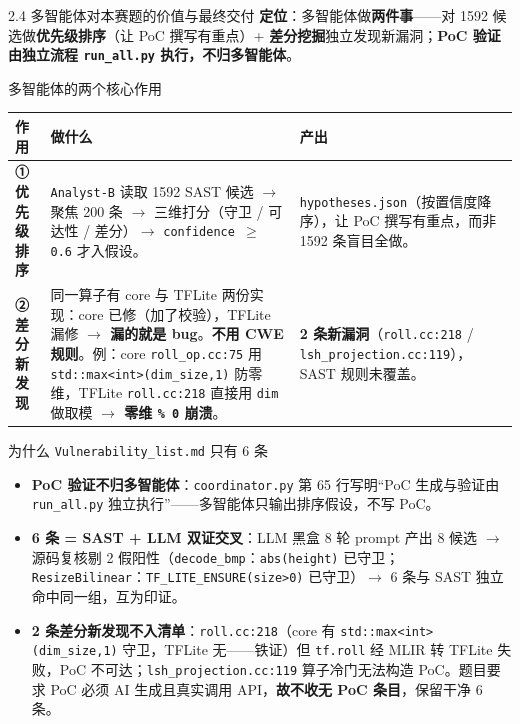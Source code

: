 \documentclass[11pt,aspectratio=169]{beamer}
\newcommand{\hl}[1]{\textcolor{red!72!black}{\textbf{#1}}}
\newcommand{\hlb}[1]{\textcolor{accentblue}{\textbf{#1}}}
\begin{document}
\begin{frame}{2.4 \quad 多智能体对本赛题的价值与最终交付}
  \footnotesize
  \hlb{定位}：多智能体做\hl{两件事}——对 1592 候选做\hl{优先级排序}（让 PoC 撰写有重点）+ \hl{差分挖掘}独立发现新漏洞；\hl{PoC 验证由独立流程 \texttt{run\_all.py} 执行，不归多智能体}。

  \vspace{0.12cm}
  \begin{block}{多智能体的两个核心作用}
    \scriptsize
    \renewcommand{\arraystretch}{1.3}
    \hspace*{-0.1cm}\begin{tabular}{p{2.6cm}p{5.4cm}p{5.0cm}}
      \toprule
      \textbf{作用} & \textbf{做什么} & \textbf{产出} \\
      \midrule
      \hlb{① 优先级排序} & \texttt{Analyst-B} 读取 1592 SAST 候选 $\rightarrow$ 聚焦 200 条 $\rightarrow$ 三维打分（守卫 / 可达性 / 差分）$\rightarrow$ \texttt{confidence $\geq$ 0.6} 才入假设。 & \texttt{hypotheses.json}（按置信度降序），让 PoC 撰写有重点，而非 1592 条盲目全做。 \\
      \hlb{② 差分新发现} & 同一算子有 core 与 TFLite 两份实现：core 已修（加了校验），TFLite 漏修 \hl{$\rightarrow$ 漏的就是 bug}。\hl{不用 CWE 规则}。例：core \texttt{roll\_op.cc:75} 用 \texttt{std::max<int>(dim\_size,1)} 防零维，TFLite \texttt{roll.cc:218} 直接用 \texttt{dim} 做取模 \hl{$\rightarrow$ 零维 \texttt{\% 0} 崩溃}。 & \hl{2 条新漏洞}（\texttt{roll.cc:218} / \texttt{lsh\_projection.cc:119}），SAST 规则未覆盖。 \\
      \bottomrule
    \end{tabular}
  \end{block}

  \vspace{0.1cm}
  \begin{block}{为什么 \texttt{Vulnerability\_list.md} 只有 6 条}
    \scriptsize
    \begin{itemize}\setlength\itemsep{1pt}\setlength\topsep{1pt}
      \item \hlb{PoC 验证不归多智能体}：\texttt{coordinator.py} 第 65 行写明``PoC 生成与验证由 \texttt{run\_all.py} 独立执行''——多智能体只输出排序假设，不写 PoC。
      \item \hlb{6 条 = SAST + LLM 双证交叉}：LLM 黑盒 8 轮 prompt 产出 8 候选 $\rightarrow$ 源码复核剔 2 假阳性（\texttt{decode\_bmp}：\texttt{abs(height)} 已守卫；\texttt{ResizeBilinear}：\texttt{TF\_LITE\_ENSURE(size>0)} 已守卫）$\rightarrow$ 6 条与 SAST 独立命中同一组，互为印证。
      \item \hlb{2 条差分新发现不入清单}：\texttt{roll.cc:218}（core 有 \texttt{std::max<int>(dim\_size,1)} 守卫，TFLite 无——铁证）但 \texttt{tf.roll} 经 MLIR 转 TFLite 失败，PoC 不可达；\texttt{lsh\_projection.cc:119} 算子冷门无法构造 PoC。题目要求 PoC 必须 AI 生成且真实调用 API，\hl{故不收无 PoC 条目}，保留干净 6 条。
    \end{itemize}
  \end{block}


\end{frame}
\end{document}
